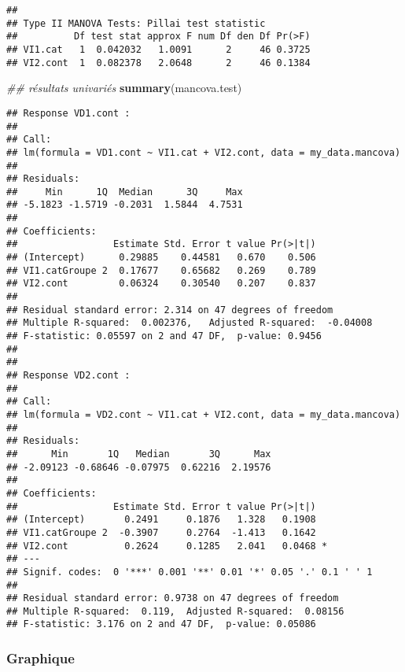 \documentclass[
]{book}
\newenvironment{Shaded}{\begin{snugshade}}{\end{snugshade}}
\newcommand{\CommentTok}[1]{\textcolor[rgb]{0.56,0.35,0.01}{\textit{#1}}}
\newcommand{\KeywordTok}[1]{\textcolor[rgb]{0.13,0.29,0.53}{\textbf{#1}}}
\newcommand{\NormalTok}[1]{#1}
\begin{document}
\begin{verbatim}
## 
## Type II MANOVA Tests: Pillai test statistic
##          Df test stat approx F num Df den Df Pr(>F)
## VI1.cat   1  0.042032   1.0091      2     46 0.3725
## VI2.cont  1  0.082378   2.0648      2     46 0.1384
\end{verbatim}

\begin{Shaded}
\begin{Highlighting}[]
\CommentTok{## résultats univariés }
\KeywordTok{summary}\NormalTok{(mancova.test)}
\end{Highlighting}
\end{Shaded}

\begin{verbatim}
## Response VD1.cont :
## 
## Call:
## lm(formula = VD1.cont ~ VI1.cat + VI2.cont, data = my_data.mancova)
## 
## Residuals:
##     Min      1Q  Median      3Q     Max 
## -5.1823 -1.5719 -0.2031  1.5844  4.7531 
## 
## Coefficients:
##                 Estimate Std. Error t value Pr(>|t|)
## (Intercept)      0.29885    0.44581   0.670    0.506
## VI1.catGroupe 2  0.17677    0.65682   0.269    0.789
## VI2.cont         0.06324    0.30540   0.207    0.837
## 
## Residual standard error: 2.314 on 47 degrees of freedom
## Multiple R-squared:  0.002376,	Adjusted R-squared:  -0.04008 
## F-statistic: 0.05597 on 2 and 47 DF,  p-value: 0.9456
## 
## 
## Response VD2.cont :
## 
## Call:
## lm(formula = VD2.cont ~ VI1.cat + VI2.cont, data = my_data.mancova)
## 
## Residuals:
##      Min       1Q   Median       3Q      Max 
## -2.09123 -0.68646 -0.07975  0.62216  2.19576 
## 
## Coefficients:
##                 Estimate Std. Error t value Pr(>|t|)  
## (Intercept)       0.2491     0.1876   1.328   0.1908  
## VI1.catGroupe 2  -0.3907     0.2764  -1.413   0.1642  
## VI2.cont          0.2624     0.1285   2.041   0.0468 *
## ---
## Signif. codes:  0 '***' 0.001 '**' 0.01 '*' 0.05 '.' 0.1 ' ' 1
## 
## Residual standard error: 0.9738 on 47 degrees of freedom
## Multiple R-squared:  0.119,	Adjusted R-squared:  0.08156 
## F-statistic: 3.176 on 2 and 47 DF,  p-value: 0.05086
\end{verbatim}

\hypertarget{graphique-22}{%
\subsubsection{Graphique}\label{graphique-22}}
\end{document}
